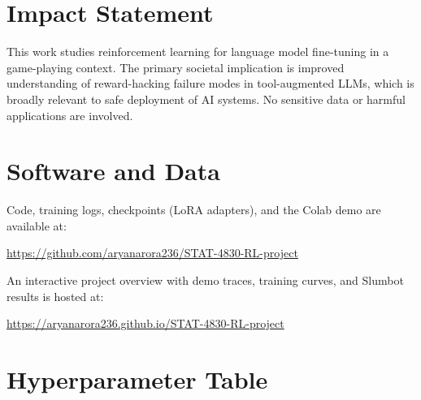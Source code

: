 \documentclass{article}
\begin{document}
\section*{Impact Statement}

This work studies reinforcement learning for language model fine-tuning
in a game-playing context.
The primary societal implication is improved understanding of
reward-hacking failure modes in tool-augmented LLMs, which is broadly
relevant to safe deployment of AI systems.
No sensitive data or harmful applications are involved.

\section*{Software and Data}

Code, training logs, checkpoints (LoRA adapters), and the Colab demo
are available at:
\begin{center}
\small\url{https://github.com/aryanarora236/STAT-4830-RL-project}
\end{center}
An interactive project overview with demo traces, training curves, and
Slumbot results is hosted at:
\begin{center}
\small\url{https://aryanarora236.github.io/STAT-4830-RL-project}
\end{center}




\newpage
\appendix
\onecolumn

\section{Hyperparameter Table}
\label{sec:hparams}
\end{document}
